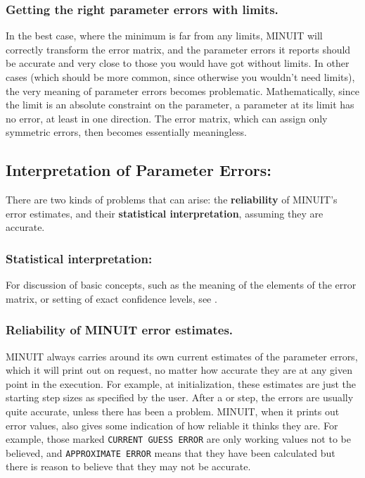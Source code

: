 \subsubsection*{Getting the right parameter errors with limits.}


In the best case, where the minimum is far from any limits,
MINUIT will correctly transform the error matrix, and the
parameter errors it reports should be accurate and very
close to those you would have got without limits.
In other cases (which should be more common, since
otherwise you wouldn't need limits), the very meaning of
parameter errors becomes problematic.  
Mathematically, since
the limit is an absolute constraint on the parameter, a parameter
at its limit has no error, at least in one direction.
The error matrix, which can assign only symmetric errors, then
becomes essentially meaningless.

\subsection{Interpretation of Parameter Errors:}

There are two kinds of problems that can arise:
the {\bf reliability} of MINUIT's error estimates, and their
{\bf statistical interpretation}, assuming they are accurate.

\subsubsection{Statistical interpretation:}

For discussion of basic concepts, such as the meaning of the elements
of the error matrix, or setting of exact
confidence levels, see \cite{bib-MINERR,bib-MIN81,bib-EADIE}.

\subsubsection{Reliability of MINUIT error estimates.}

MINUIT always carries around its own current estimates of the
parameter errors, which it will print out on request, no matter how
accurate they are at any given point in the execution.
For example, at initialization, these estimates are just the starting
step sizes as specified by the user.  
After a  or   step,
the errors are usually quite accurate, unless there has been a problem.
MINUIT, when it prints out error values,
also gives some indication of how reliable it thinks they are.
For example, those marked \texttt{CURRENT GUESS ERROR}
are only working values
not to be believed, and \texttt{APPROXIMATE ERROR}
means that they have been
calculated but there is reason to believe that they may not be accurate.


